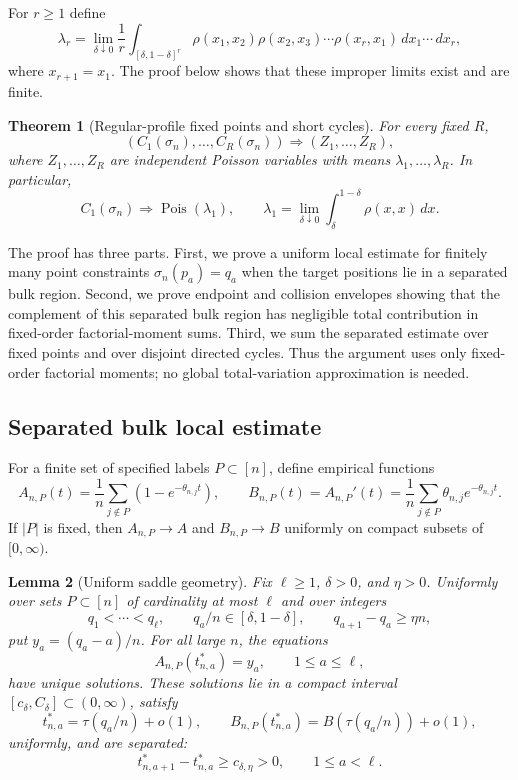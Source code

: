 \documentclass[11pt]{article}
\newtheorem{theorem}{Theorem}[section]
\newtheorem{lemma}[theorem]{Lemma}
\theoremstyle{remark}
\newcommand{\Pois}{\operatorname{Pois}}
\newcommand{\dd}{\,d}
\begin{document}
For \(r\ge1\) define
\[
        \lambda_r
        =\lim_{\delta\downarrow0}\frac1r
        \int_{[\delta,1-\delta]^r}
        \rho(x_1,x_2)\rho(x_2,x_3)\cdots\rho(x_r,x_1)
        \dd x_1\cdots\dd x_r,
\]
where \(x_{r+1}=x_1\).  The proof below shows that these improper limits exist and are finite.

\begin{theorem}[Regular-profile fixed points and short cycles]\label{thm:regular-cycles}
For every fixed \(R\),
\[
        (C_1(\sigma_n),\ldots,C_R(\sigma_n))
        \Rightarrow (Z_1,\ldots,Z_R),
\]
where \(Z_1,\ldots,Z_R\) are independent Poisson variables with means
\(\lambda_1,\ldots,\lambda_R\).  In particular,
\[
        C_1(\sigma_n)\Rightarrow\Pois(\lambda_1),
        \qquad
        \lambda_1=\lim_{\delta\downarrow0}\int_\delta^{1-\delta}\rho(x,x)\dd x .
\]
\end{theorem}

The proof has three parts.  First, we prove a uniform local estimate for finitely many point constraints \(\sigma_n(p_a)=q_a\) when the target positions lie in a separated bulk region.  Second, we prove endpoint and collision envelopes showing that the complement of this separated bulk region has negligible total contribution in fixed-order factorial-moment sums.  Third, we sum the separated estimate over fixed points and over disjoint directed cycles.  Thus the argument uses only fixed-order factorial moments; no global total-variation approximation is needed.

\subsection{Separated bulk local estimate}

For a finite set of specified labels \(P\subset[n]\), define empirical functions
\[
        A_{n,P}(t)=\frac1n\sum_{j\notin P}(1-e^{-\theta_{n,j}t}),
        \qquad
        B_{n,P}(t)=A_{n,P}'(t)=\frac1n\sum_{j\notin P}\theta_{n,j}e^{-\theta_{n,j}t}.
\]
If \(|P|\) is fixed, then \(A_{n,P}\to A\) and \(B_{n,P}\to B\) uniformly on compact subsets of \([0,\infty)\).

\begin{lemma}[Uniform saddle geometry]\label{lem:regular-saddle-geometry}
Fix \(\ell\ge1\), \(\delta>0\), and \(\eta>0\).  Uniformly over sets \(P\subset[n]\) of cardinality at most \(\ell\) and over integers
\[
        q_1<\cdots<q_\ell,
        \qquad q_a/n\in[\delta,1-\delta],
        \qquad q_{a+1}-q_a\ge \eta n,
\]
put \(y_a=(q_a-a)/n\).  For all large \(n\), the equations
\[
        A_{n,P}(t_{n,a}^*)=y_a,
        \qquad 1\le a\le\ell,
\]
have unique solutions.  These solutions lie in a compact interval
\([c_\delta,C_\delta]\subset(0,\infty)\), satisfy
\[
        t_{n,a}^*=\tau(q_a/n)+o(1),
        \qquad
        B_{n,P}(t_{n,a}^*)=B(\tau(q_a/n))+o(1),
\]
uniformly, and are separated:
\[
        t_{n,a+1}^*-t_{n,a}^*\ge c_{\delta,\eta}>0,
        \qquad 1\le a<\ell .
\]
\end{lemma}
\end{document}
